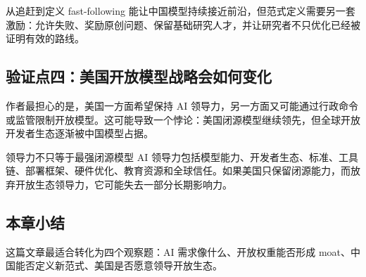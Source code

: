 \begin{importantbox}{从追赶到定义}
fast-following 能让中国模型持续接近前沿，但范式定义需要另一套激励：允许失败、奖励原创问题、保留基础研究人才，并让研究者不只优化已经被证明有效的路线。
\end{importantbox}

\subsection{验证点四：美国开放模型战略会如何变化}

作者最担心的是，美国一方面希望保持 AI 领导力，另一方面又可能通过行政命令或监管限制开放模型。这可能导致一个悖论：美国闭源模型继续领先，但全球开放开发者生态逐渐被中国模型占据。

\begin{warningbox}{领导力不只等于最强闭源模型}
AI 领导力包括模型能力、开发者生态、标准、工具链、部署框架、硬件优化、教育资源和全球信任。如果美国只保留闭源能力，而放弃开放生态领导力，它可能失去一部分长期影响力。
\end{warningbox}

\subsection{本章小结}

这篇文章最适合转化为四个观察题：AI 需求像什么、开放权重能否形成 moat、中国能否定义新范式、美国是否愿意领导开放生态。


